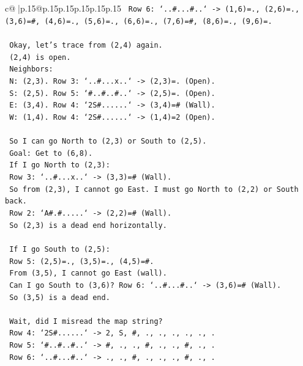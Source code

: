 \documentclass{article}
\begin{document}
{\begin{supertabular}{c@{$\;$}|p{.15\linewidth}@{}p{.15\linewidth}p{.15\linewidth}p{.15\linewidth}p{.15\linewidth}p{.15\linewidth}}
{{{\texttt{   Row 6: `..\#...\#..` {-}> (1,6)=., (2,6)=., (3,6)=\#, (4,6)=., (5,6)=., (6,6)=., (7,6)=\#, (8,6)=., (9,6)=.} \\
\\ 
\texttt{   Okay, let's trace from (2,4) again.} \\
\texttt{   (2,4) is open.} \\
\texttt{   Neighbors:} \\
\texttt{   N: (2,3). Row 3: `..\#...x..` {-}> (2,3)=. (Open).} \\
\texttt{   S: (2,5). Row 5: `\#..\#..\#..` {-}> (2,5)=. (Open).} \\
\texttt{   E: (3,4). Row 4: `2S\#......` {-}> (3,4)=\# (Wall).} \\
\texttt{   W: (1,4). Row 4: `2S\#......` {-}> (1,4)=2 (Open).} \\
\\ 
\texttt{   So I can go North to (2,3) or South to (2,5).} \\
\texttt{   Goal: Get to (6,8).} \\
\texttt{   If I go North to (2,3):} \\
\texttt{     Row 3: `..\#...x..` {-}> (3,3)=\# (Wall).} \\
\texttt{     So from (2,3), I cannot go East. I must go North to (2,2) or South back.} \\
\texttt{     Row 2: `A\#.\#.....` {-}> (2,2)=\# (Wall).} \\
\texttt{     So (2,3) is a dead end horizontally.} \\
\\ 
\texttt{   If I go South to (2,5):} \\
\texttt{     Row 5: (2,5)=., (3,5)=., (4,5)=\#.} \\
\texttt{     From (3,5), I cannot go East (wall).} \\
\texttt{     Can I go South to (3,6)? Row 6: `..\#...\#..` {-}> (3,6)=\# (Wall).} \\
\texttt{     So (3,5) is a dead end.} \\
\\ 
\texttt{   Wait, did I misread the map string?} \\
\texttt{   Row 4: `2S\#......` {-}> 2, S, \#, ., ., ., ., ., .} \\
\texttt{   Row 5: `\#..\#..\#..` {-}> \#, ., ., \#, ., ., \#, ., .} \\
\texttt{   Row 6: `..\#...\#..` {-}> ., ., \#, ., ., ., \#, ., .} \\
\\ 
}}}
\end{supertabular}}
\end{document}
